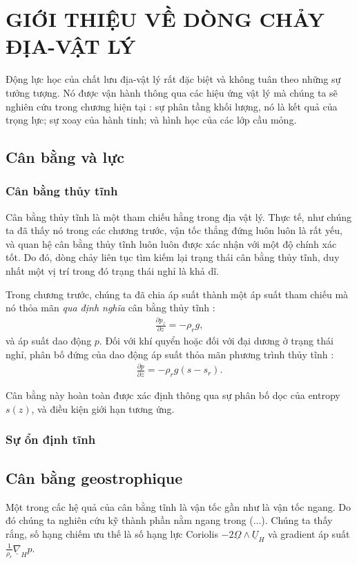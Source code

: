 \documentclass[DONG_HOC_KHI_QUYEN.tex]{subfiles}
\begin{document}
\chapter{GIỚI THIỆU VỀ DÒNG CHẢY ĐỊA-VẬT LÝ}
Động lực học của chất lưu địa-vật lý rất đặc biệt và không tuân theo những sự tưởng tượng. Nó được vận hành thông qua các hiệu ứng vật lý mà chúng ta sẽ nghiên cứu trong chương hiện tại : sự phân tầng khối lượng, nó là kết quả của trọng lực; sự xoay của hành tinh; và hình học của các lớp cầu mỏng.
\section{Cân bằng và lực}
\subsection{Cân bằng thủy tĩnh}
Cân bằng thủy tĩnh là một tham chiếu hằng trong địa vật lý. Thực tế, như chúng ta đã thấy nó trong các chương trước, vận tốc thẳng đứng luôn luôn là rất yếu, và quan hệ cân bằng thủy tĩnh luôn luôn được xác nhận với một độ chính xác tốt. Do đó, dòng chảy liên tục tìm kiếm lại trạng thái cân bằng thủy tĩnh, duy nhất một vị trí trong đó trạng thái nghỉ là khả dĩ.

Trong chương trước, chúng ta đã chia áp suất thành một áp suất tham chiếu mà nó thỏa mãn \emph{qua định nghĩa} cân bằng thủy tĩnh :
\begin{equation}
    \begin{aligned}
        \frac{{\partial {p_z}}}{{\partial z}} =  - {\rho _r}g,
    \end{aligned}
\end{equation}
và áp suất dao động $p$. Đối với khí quyển hoặc đối với đại dương ở trạng thái nghỉ, phân bố đứng của dao động áp suất thỏa mãn phương trình thủy tĩnh :
\begin{equation}
    \begin{aligned}
        \frac{{\partial {p}}}{{\partial z}} =  - {\rho _r}g(s-s_r).
    \end{aligned}
\end{equation}

Cân bằng này hoàn toàn được xác định thông qua sự phân bố dọc của entropy $s(z)$, và điều kiện giới hạn tương ứng.
\subsection{Sự ổn định tĩnh}

\section{Cân bằng geostrophique}
Một trong cấc hệ quả của cân bằng tĩnh là vận tốc gần như là vận tốc ngang. Do đó chúng ta nghiên cứu kỹ thành phần nằm ngang trong (...). Chúng ta thấy rắng, số hạng chiếm ưu thế là số hạng lực Coriolis $-2\underline{\Omega}\wedge\underline{U}_H$ và gradient áp suất $\displaystyle\frac{1}{\rho_r}\underline{\nabla}_H p$.
\end{document}
